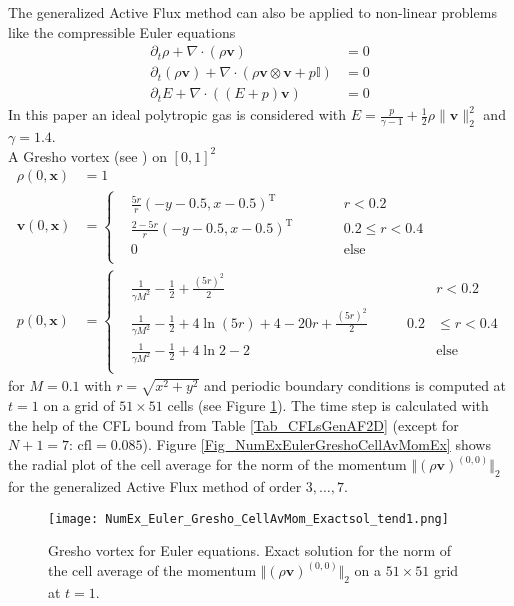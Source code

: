 \documentclass[12pt,a4paper]{article}
\begin{document}
The generalized Active Flux method can also be applied to non-linear problems like the compressible Euler equations
\begin{align*}
	\partial_t \rho + \nabla \cdot (\rho \mathbf v) &= 0 \\
	\partial_t (\rho \mathbf v) +  \nabla \cdot (\rho \mathbf v \otimes \mathbf v + p \mathbb I) &= 0 \\
	\partial_t E + \nabla \cdot ((E+p)\mathbf v) &= 0
\end{align*}
In this paper an ideal polytropic gas is considered with \(E = \frac{p}{\gamma - 1} +\frac{1}{2}\rho \lVert \mathbf v \rVert^2_2 \) and \(\gamma =1.4\).\\
A Gresho vortex (see \cite{GC1990, BEKMR2017aa}) on $[0, 1]^2$
\begin{align*}
	\rho(0, \mathbf x) &= 1\\
	\mathbf v(0, \mathbf x) &= {\left\lbrace
	\begin{aligned}
	&\tfrac{5r}{r}(-y-0.5,x-0.5)^\mathrm{T} &\qquad  & r < 0.2\\
	&\tfrac{2-5r}{r}(-y-0.5,x-0.5)^\mathrm{T}& \qquad & 0.2 \leq r < 0.4\\
	&0& \qquad & \text{else}\\
	\end{aligned}
	\right.
	}\\ 
	p(0, \mathbf x) &=\left\lbrace
	\begin{aligned}
	 &\tfrac{1}{\gamma M^2}-\tfrac{1}{2}+ \tfrac{(5r)^2}{2} & \qquad &r < 0.2\\
	 &\tfrac{1}{\gamma M^2}-\tfrac{1}{2}+ 4\ln(5r)+4-20r+ \tfrac{(5r)^2}{2} & \qquad 0.2 &\leq r < 0.4\\
	 &\tfrac{1}{\gamma M^2}-\tfrac{1}{2}+ 4\ln2-2 & \qquad &\text{else}\\
	\end{aligned}
	\right.
\end{align*}
for $M=0.1$ with \(r = \sqrt{x^2+y^2}\) and periodic boundary conditions is computed at \(t = 1\) on a grid of \(51\times 51\) cells (see Figure \ref{Fig_NumExEulerGreshoCellAvMomExSoltend1}). The time step is calculated with the help of the CFL bound from Table \ref{Tab_CFLsGenAF2D} (except for $N+1=7$: $\mathrm{cfl} = 0.085$). 
Figure \ref{Fig_NumExEulerGreshoCellAvMomEx} shows the radial plot of the cell average for the norm of the momentum \(\Vert (\rho \mathbf v)^{(0,0)}\Vert_2\) for the generalized Active Flux method of order \(3, \dots, 7\). 

\begin{figure}
	\centering
	\texttt{[image: NumEx\_Euler\_Gresho\_CellAvMom\_Exactsol\_tend1.png]}
	\caption{\label{Fig_NumExEulerGreshoCellAvMomExSoltend1} Gresho vortex for Euler equations. Exact solution for the norm of the cell average of the momentum $\Vert (\rho \mathbf v)^{(0,0)}\Vert_2$ on a \(51\times51\) grid at \(t= 1\).}
\end{figure}
\end{document}

